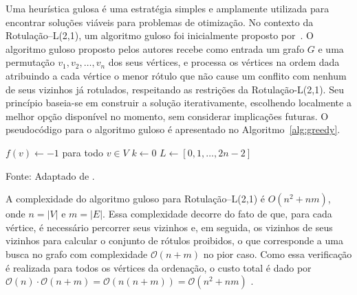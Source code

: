 Uma heurística gulosa é uma estratégia simples e amplamente utilizada para encontrar soluções viáveis para problemas de otimização. No contexto da Rotulação–L(2,1), um algoritmo guloso foi inicialmente proposto por~. O algoritmo guloso proposto pelos autores recebe como entrada um grafo $G$ e uma permutação $v_1,v_2,\ldots,v_n$ dos seus vértices, e processa os vértices na ordem dada atribuindo a cada vértice o menor rótulo que não cause um conflito com nenhum de seus vizinhos já rotulados, respeitando as restrições da Rotulação-L(2,1). Seu princípio baseia-se em construir a solução iterativamente, escolhendo localmente a melhor opção disponível no momento, sem considerar implicações futuras. O pseudocódigo para o algoritmo guloso é apresentado no Algoritmo~\ref{alg:greedy}.

\begin{algorithm}[H]
\caption{Heurística Gulosa para Rotulação--L(2,1)}
\label{alg:greedy}

$f(v) \gets -1$ para todo $v \in V$\;
$k \gets 0$\;
$L \gets [0, 1, \dots, 2n-2]$ 

\end{algorithm}
\noindent Fonte: Adaptado de .



A complexidade do algoritmo guloso para Rotulação–L(2,1) é \( O(n^2 + nm) \), onde \( n = |V| \) e \( m = |E| \). Essa complexidade decorre do fato de que, para cada vértice, é necessário percorrer seus vizinhos e, em seguida, os vizinhos de seus vizinhos para calcular o conjunto de rótulos proibidos, o que corresponde a uma busca no grafo com complexidade \( \mathcal{O}(n + m) \) no pior caso. Como essa verificação é realizada para todos os vértices da ordenação, o custo total é dado por \( \mathcal{O}(n) \cdot \mathcal{O}(n + m) = \mathcal{O}(n(n + m)) = \mathcal{O}(n^2 + nm) \) \cite{posner20092}.

